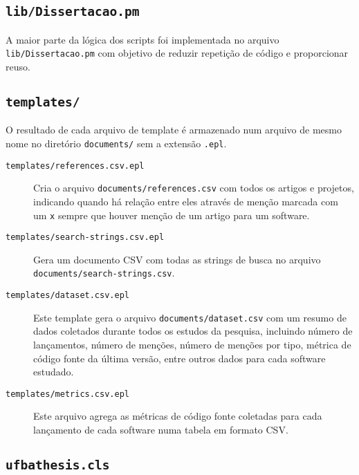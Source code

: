 \subsection{\texttt{lib/Dissertacao.pm}}

A maior parte da lógica dos scripts foi implementada no arquivo
\texttt{lib/Dissertacao.pm} com objetivo de reduzir repetição de código e
proporcionar reuso.

\subsection{\texttt{templates/}}

O resultado de cada arquivo de template é armazenado num arquivo de mesmo nome
no diretório \texttt{documents/} sem a extensão \texttt{.epl}.

\begin{description}

  \item [\texttt{templates/references.csv.epl}]
    Cria o arquivo \texttt{documents/references.csv} com todos os artigos e
    projetos, indicando quando há relação entre eles através de menção marcada
    com um \texttt{x} sempre que houver menção de um artigo para um software.

  \item [\texttt{templates/search-strings.csv.epl}]
    Gera um documento CSV com todas as strings de busca no arquivo
    \texttt{documents/search-strings.csv}.

  \item [\texttt{templates/dataset.csv.epl}]
    Este template gera o arquivo \texttt{documents/dataset.csv} com um resumo de
    dados coletados durante todos os estudos da pesquisa, incluindo número de lançamentos,
    número de menções, número de menções por tipo, métrica de código fonte da última
    versão, entre outros dados para cada software estudado.

  \item [\texttt{templates/metrics.csv.epl}]
    Este arquivo agrega as métricas de código fonte coletadas para cada lançamento
    de cada software numa tabela em formato CSV.


\end{description}

\subsection{\texttt{ufbathesis.cls}}


